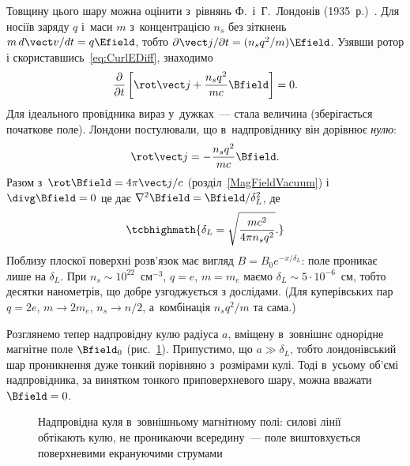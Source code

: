 Товщину цього шару можна оцінити з~рівнянь Ф.~і~Г.~Лондонів (1935~р.)~\cite{London1935}. Для носіїв заряду
$q$ і~маси $m$ з~концентрацією $n_s$ без зіткнень $m\,d\vect v/dt=q\Efield$, тобто
$\partial\vect j/\partial t=(n_sq^2/m)\Efield$. Узявши ротор і
скориставшись~\eqref{eq:CurlEDiff}, знаходимо
\begin{equation*}
	\frac{\partial}{\partial t}\left[\rot\vect j+\frac{n_sq^2}{mc}\Bfield\right]=0.
\end{equation*}
Для ідеального провідника вираз у~дужках~--- стала величина (зберігається початкове поле).
Лондони постулювали, що в~надпровіднику він дорівнює \emph{нулю}:
\begin{equation}\label{eq:LondonSecond}
	\rot\vect j=-\frac{n_sq^2}{mc}\Bfield.
\end{equation}
Разом з~$\rot\Bfield=4\pi\vect j/c$ (розділ~\ref{MagFieldVacuum}) і~$\divg\Bfield=0$ це дає
$\nabla^2\Bfield=\Bfield/\delta_L^2$, де
\begin{equation}\label{eq:LondonDepth}
	\tcbhighmath{ \delta_L=\sqrt{\frac{mc^2}{4\pi n_sq^2}}. }
\end{equation}
Поблизу плоскої поверхні розв'язок має вигляд $B=B_0e^{-x/\delta_L}$: поле проникає лише
на  $\delta_L$. При $n_s\sim10^{22}$~см$^{-3}$, $q=e$, $m=m_e$
маємо $\delta_L\sim5\cdot10^{-6}$~см, тобто десятки нанометрів, що добре узгоджується з
дослідами. (Для куперівських пар $q=2e$, $m\to2m_e$, $n_s\to n/2$, а~комбінація $n_sq^2/m$
та сама.)

Розглянемо тепер надпровідну кулю радіуса $a$, вміщену в~зовнішнє однорідне магнітне поле
$\Bfield_0$ (рис.~\ref{pic:BSupercond}). Припустимо, що $a\gg\delta_L$, тобто
лондонівський шар проникнення дуже тонкий порівняно з~розмірами кулі. Тоді в~усьому об'ємі
надпровідника, за винятком тонкого приповерхневого шару, можна вважати $\Bfield=0$.

\begin{figure}[h!]\centering
	\caption{Надпровідна куля в~зовнішньому магнітному полі: силові лінії обтікають кулю,
		не проникаючи всередину~--- поле виштовхується поверхневими екрануючими
		струмами\label{pic:BSupercond}}
\end{figure}

